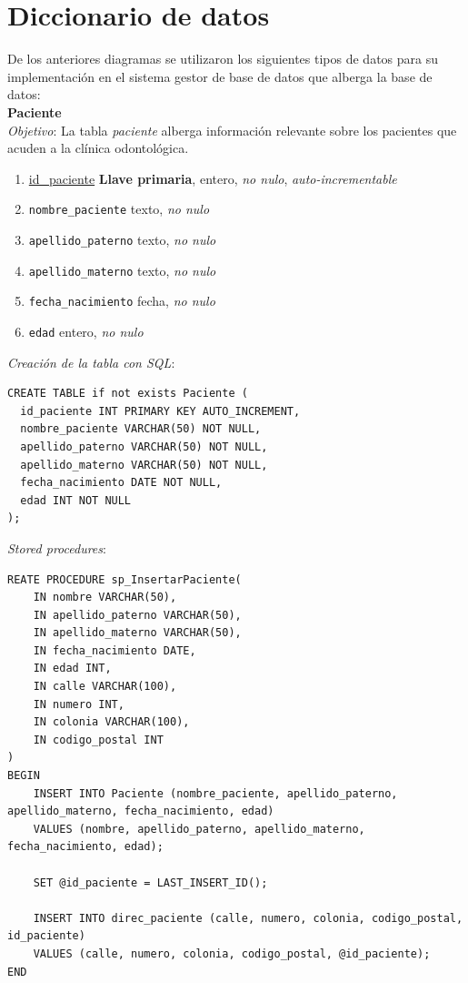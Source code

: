 \documentclass[a4paper,12pt]{article}
\begin{document}
\newpage

\section{Diccionario de datos}

De los anteriores diagramas se utilizaron los siguientes tipos de datos para su implementación en el sistema gestor de base de datos que alberga la base de datos:\\

\textbf{Paciente} \\ \emph{Objetivo}: La tabla \emph{paciente} alberga información relevante sobre los pacientes que acuden a la clínica odontológica.
\begin{enumerate}
	\item \underline{id\_paciente} \textbf{Llave primaria}, entero, \emph{no nulo}, \textit{auto-incrementable}
	\item \texttt{nombre\_paciente} texto, \emph{no nulo}
	\item \texttt{apellido\_paterno} texto, \emph{no nulo}
	\item \texttt{apellido\_materno} texto, \emph{no nulo}
	\item \texttt{fecha\_nacimiento} fecha, \emph{no nulo}
	\item \texttt{edad} entero, \emph{no nulo}
\end{enumerate}

\emph{Creación de la tabla con SQL}: 
\begin{verbatim}
CREATE TABLE if not exists Paciente (
  id_paciente INT PRIMARY KEY AUTO_INCREMENT,
  nombre_paciente VARCHAR(50) NOT NULL,
  apellido_paterno VARCHAR(50) NOT NULL,
  apellido_materno VARCHAR(50) NOT NULL,
  fecha_nacimiento DATE NOT NULL,
  edad INT NOT NULL
);
\end{verbatim}

\emph{Stored procedures}:

\begin{verbatim}
REATE PROCEDURE sp_InsertarPaciente(
    IN nombre VARCHAR(50),
    IN apellido_paterno VARCHAR(50),
    IN apellido_materno VARCHAR(50),
    IN fecha_nacimiento DATE,
    IN edad INT,
    IN calle VARCHAR(100),
    IN numero INT,
    IN colonia VARCHAR(100),
    IN codigo_postal INT
)
BEGIN
    INSERT INTO Paciente (nombre_paciente, apellido_paterno, apellido_materno, fecha_nacimiento, edad)
    VALUES (nombre, apellido_paterno, apellido_materno, fecha_nacimiento, edad);
    
    SET @id_paciente = LAST_INSERT_ID();
    
    INSERT INTO direc_paciente (calle, numero, colonia, codigo_postal, id_paciente)
    VALUES (calle, numero, colonia, codigo_postal, @id_paciente);
END
\end{verbatim}
\end{document}
